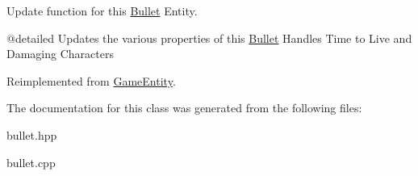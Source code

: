 Update function for this \mbox{\hyperlink{class_bullet}{Bullet}} Entity. 

@detailed Updates the various properties of this \mbox{\hyperlink{class_bullet}{Bullet}} Handles Time to Live and Damaging Characters 

Reimplemented from \mbox{\hyperlink{class_game_entity_a49d0e8b07028c0f7884c3daf35521375}{Game\+Entity}}.



The documentation for this class was generated from the following files\+:\begin{DoxyCompactItemize}
\item 
bullet.\+hpp\item 
bullet.\+cpp\end{DoxyCompactItemize}
